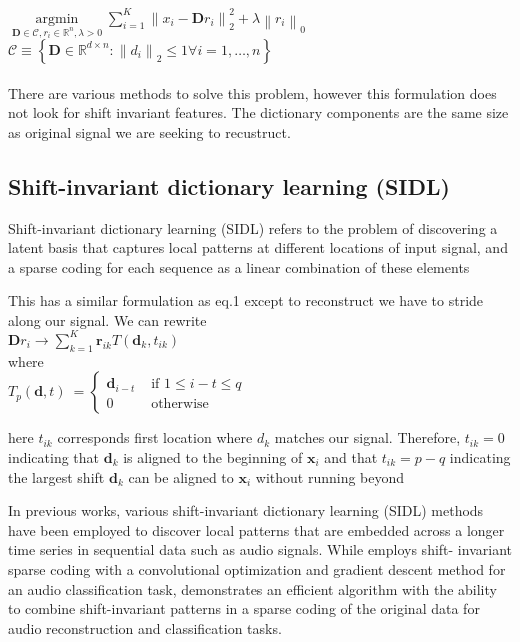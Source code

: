 \documentclass[11pt,a4paper]{article}
\begin{document}
$\underset{\mathbf{D} \in \mathcal{C}, r_{i} \in \mathbb{R}^{n}, \lambda>0} {\operatorname{argmin}} \sum_{i=1}^{K}\left\|x_{i}-\mathbf{D} r_{i}\right\|_{2}^{2}+\lambda\left\|r_{i}\right\|_{0}$ \\   $\mathcal{C} \equiv\left\{\mathbf{D} \in \mathbb{R}^{d \times n}:\left\|d_{i}\right\|_{2} \leq 1 \forall i=1, \ldots, n\right\} $
\\ \\
There are various methods to solve this problem, however this formulation does not look for shift invariant features. The dictionary components are the same size as original signal we are seeking to recustruct.

\subsection{ Shift-invariant dictionary learning (SIDL)  }

Shift-invariant dictionary learning (SIDL) refers to the problem of discovering a latent basis that captures local patterns at different locations of input signal, and a sparse coding for each sequence as a linear combination of these elements \cite{Zheng2016} 

This has a similar formulation as eq.1 except to reconstruct we have to stride along our signal. We can rewrite \\
$\mathbf{D} r_{i} \longrightarrow \sum_{k=1}^{K} \boldsymbol{r}_{i k} T\left(\mathbf{d}_{k}, t_{i k}\right)$
\\
where \\
$T_{p}(\mathbf{d}, t) \ =\begin{cases}\mathbf{d}_{i-t} & \text { if } 1 \leq i-t \leq q \\ 0 & \text { otherwise }\end{cases}$

here $t_{i k}$ corresponds first location where $d_k$ matches our signal. Therefore, $t_{i k}=0$ indicating that $\mathbf{d}_{k}$ is aligned to the beginning of $\mathbf{x}_{i}$ and that $t_{i k}=p-q$ indicating the largest shift $\mathbf{d}_{k}$ can be aligned to $\mathbf{x}_{i}$ without running beyond


In previous works, various shift-invariant dictionary learning (SIDL) methods have been employed to discover local patterns that are embedded across a longer time series in sequential data such as audio signals. While \cite{Grosse2007} employs shift-
invariant sparse coding with a convolutional optimization and gradient descent method for an audio classification task, \cite{Zheng2016} demonstrates an efficient algorithm with the ability to combine shift-invariant patterns in a sparse coding of the original data for audio reconstruction and classification tasks. 
\end{document}
